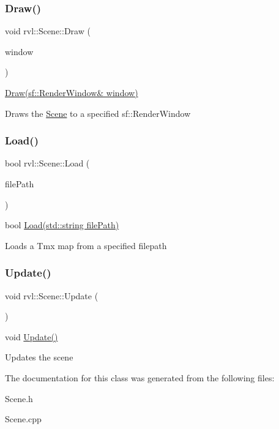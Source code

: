 \subsubsection{\texorpdfstring{Draw()}{Draw()}}
{\footnotesize\ttfamily void rvl\+::\+Scene\+::\+Draw (\begin{DoxyParamCaption}\item[{sf\+::\+Render\+Window \&}]{window }\end{DoxyParamCaption})}



\hyperlink{classrvl_1_1_scene_a62dd092ce10da061bb2bbb49eb0607db}{Draw(sf\+::\+Render\+Window\& window)} 

Draws the \hyperlink{classrvl_1_1_scene}{Scene} to a specified sf\+::\+Render\+Window \mbox{\label{classrvl_1_1_scene_ab871b7005408e83aaf2df91051338c5f}} 
\subsubsection{\texorpdfstring{Load()}{Load()}}
{\footnotesize\ttfamily bool rvl\+::\+Scene\+::\+Load (\begin{DoxyParamCaption}\item[{std\+::string}]{file\+Path }\end{DoxyParamCaption})}



bool \hyperlink{classrvl_1_1_scene_ab871b7005408e83aaf2df91051338c5f}{Load(std\+::string file\+Path)} 

Loads a Tmx map from a specified filepath \mbox{\label{classrvl_1_1_scene_ae6675125abb9ee6dc2e1be81aef3e270}} 
\subsubsection{\texorpdfstring{Update()}{Update()}}
{\footnotesize\ttfamily void rvl\+::\+Scene\+::\+Update (\begin{DoxyParamCaption}{ }\end{DoxyParamCaption})}



void \hyperlink{classrvl_1_1_scene_ae6675125abb9ee6dc2e1be81aef3e270}{Update()} 

Updates the scene 

The documentation for this class was generated from the following files\+:\begin{DoxyCompactItemize}
\item 
Scene.\+h\item 
Scene.\+cpp\end{DoxyCompactItemize}
